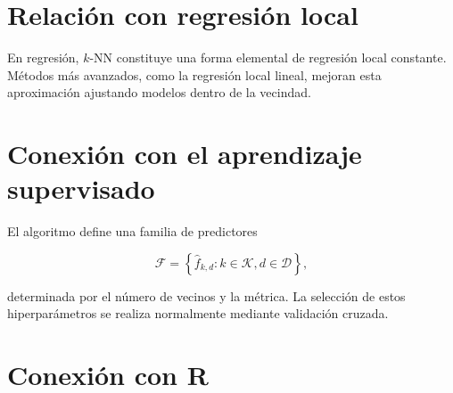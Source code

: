 \documentclass[
  spanish,
  11pt,
  letterpaper,
  DIV=11,
  numbers=noendperiod]{scrreprt}
\theoremstyle{definition}
\theoremstyle{plain}
\theoremstyle{definition}
\theoremstyle{remark}
\begin{document}
\section{Relación con regresión
local}\label{relaciuxf3n-con-regresiuxf3n-local}

En regresión, \(k\)-NN constituye una forma elemental de regresión local
constante. Métodos más avanzados, como la regresión local lineal,
mejoran esta aproximación ajustando modelos dentro de la vecindad.

\section{Conexión con el aprendizaje
supervisado}\label{conexiuxf3n-con-el-aprendizaje-supervisado}

El algoritmo define una familia de predictores

\[
\mathcal{F}
=
\left\{
\widehat{f}_{k,d}: k\in\mathcal{K}, d\in\mathcal{D}
\right\},
\]

determinada por el número de vecinos y la métrica. La selección de estos
hiperparámetros se realiza normalmente mediante validación cruzada.

\section{Conexión con R}\label{conexiuxf3n-con-r-11}
\end{document}
